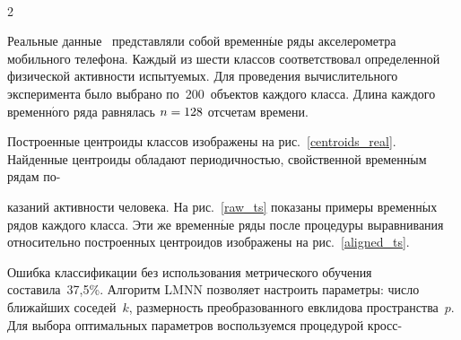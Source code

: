 \begin{figure*}[b] %
\vspace*{-12pt}
 \begin{center}
 \mbox{%
 \epsfxsize=164.279mm
 }
 \end{center}
 \vspace*{-9pt}
\label{raw_ts}
\end{figure*}

\begin{multicols}{2}




Реальные данные~\cite{UCI_HarDataset} представляли собой вре\-мен\-н$\acute{\mbox{ы}}$е 
ряды  акселерометра мобильного телефона.
Каж\-дый из шести классов соответствовал определенной физической активности испытуемых.
Для проведения вычислительного эксперимента было выбрано по~200~объектов каж\-до\-го класса.
Длина каж\-до\-го временн$\acute{\mbox{о}}$го ряда равнялась $n \hm= 128$ отсчетам времени.



Построенные центроиды классов изображены на рис.~\ref{centroids_real}.
Найденные центроиды обладают периодичностью, свойственной временн$\acute{\mbox{ы}}$м 
рядам 
по-\linebreak %

\columnbreak

\noindent
казаний активности человека.
На рис.~\ref{raw_ts} показаны примеры временн$\acute{\mbox{ы}}$х рядов каждого класса. 
Эти же временн$\acute{\mbox{ы}}$е ряды после процедуры выравнивания относительно построенных 
центроидов изображены на рис.~\ref{aligned_ts}.




Ошибка классификации без использования мет\-ри\-ческого обучения составила~37,5\%.
Алгоритм LMNN позволяет настроить параметры: число ближайших соседей~$k$,
размерность преобразованного евклидова пространства~$p$.
Для выбора оптимальных параметров воспользуемся процедурой кросс-\linebreak %

\end{multicols}

\begin{figure*}[b] %
\vspace*{-24pt}
 \begin{center}
 \mbox{%
 \epsfxsize=164.306mm
 }
 \end{center}
 \vspace*{-9pt}
\label{aligned_ts}
\end{figure*}

